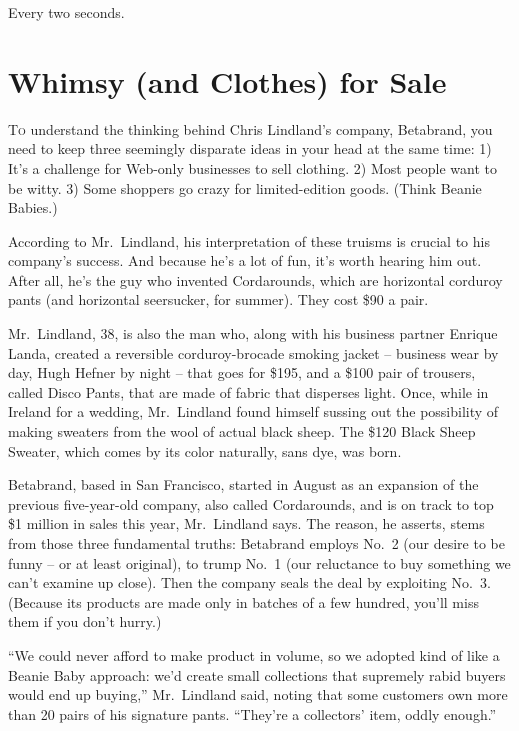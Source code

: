 ﻿\documentclass[12pt]{article}
\begin{document}
Every two seconds.

\section{Whimsy (and Clothes) for Sale}

\lettrine{T}{o} understand the thinking behind Chris Lindland's company,
Betabrand, you need to keep three seemingly disparate ideas in your head at the same time: 1) It's a
challenge for Web-only businesses to sell clothing. 2) Most people want to be witty. 3) Some
shoppers go crazy for limited-edition goods. (Think Beanie Babies.)

According to Mr.~Lindland, his interpretation of these truisms is crucial to his company's success.
And because he's a lot of fun, it's worth hearing him out. After all, he's the guy who invented
Cordarounds, which are horizontal corduroy pants (and horizontal seersucker, for summer). They cost
\$90 a pair.

Mr.~Lindland, 38, is also the man who, along with his business partner Enrique Landa, created a
reversible corduroy-brocade smoking jacket -- business wear by day, Hugh Hefner by night -- that
goes for \$195, and a \$100 pair of trousers, called Disco Pants, that are made of fabric that
disperses light. Once, while in Ireland for a wedding, Mr.~Lindland found himself sussing out the
possibility of making sweaters from the wool of actual black sheep. The \$120 Black Sheep Sweater,
which comes by its color naturally, sans dye, was born.

Betabrand, based in San Francisco, started in August as an expansion of the previous five-year-old
company, also called Cordarounds, and is on track to top \$1 million in sales this year,
Mr.~Lindland says. The reason, he asserts, stems from those three fundamental truths: Betabrand
employs No.~2 (our desire to be funny -- or at least original), to trump No.~1 (our reluctance to
buy something we can't examine up close). Then the company seals the deal by exploiting No.~3.
(Because its products are made only in batches of a few hundred, you'll miss them if you don't
hurry.)

``We could never afford to make product in volume, so we adopted kind of like a Beanie Baby
approach: we'd create small collections that supremely rabid buyers would end up buying,''
Mr.~Lindland said, noting that some customers own more than 20 pairs of his signature pants.
``They're a collectors' item, oddly enough.''
\end{document}
